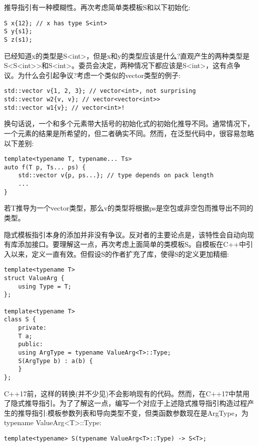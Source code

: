推导指引有一种模糊性。再次考虑简单类模板S和以下初始化:

\begin{lstlisting}[style=styleCXX]
S x{12}; // x has type S<int>
S y{s1};
S z(s1);
\end{lstlisting}

已经知道x的类型是S<int>，但是x和y的类型应该是什么?直观产生的两种类型是S<S<int>{}>和S<int>。委员会决定，两种情况下都应该是S<int>，这有点争议。为什么会引起争议?考虑一个类似的vector类型的例子:

\begin{lstlisting}[style=styleCXX]
std::vector v{1, 2, 3}; // vector<int>, not surprising
std::vector w2{v, v}; // vector<vector<int>>
std::vector w1{v}; // vector<int>!
\end{lstlisting}

换句话说，一个和多个元素带大括号的初始化式的初始化推导不同。通常情况下，一个元素的结果是所希望的，但二者确实不同。然而，在泛型代码中，很容易忽略以下差别:

\begin{lstlisting}[style=styleCXX]
template<typename T, typename... Ts>
auto f(T p, Ts... ps) {
	std::vector v{p, ps...}; // type depends on pack length
	...
}
\end{lstlisting}

若T推导为一个vector类型，那么v的类型将根据ps是空包或非空包而推导出不同的类型。

隐式模板指引本身的添加并非没有争议。反对者的主要论点是，该特性会自动向现有库添加接口。要理解这一点，再次考虑上面简单的类模板S。自模板在C++中引入以来，定义一直有效。但假设S的作者扩充了库，使得S的定义更加精细:

\begin{lstlisting}[style=styleCXX]
template<typename T>
struct ValueArg {
	using Type = T;
};

template<typename T>
class S {
	private:
	T a;
	public:
	using ArgType = typename ValueArg<T>::Type;
	S(ArgType b) : a(b) {
	}
};
\end{lstlisting}

C++17前，这样的转换(并不少见)不会影响现有的代码。然而，在C++17中禁用了隐式推导指引。为了了解这一点，编写一个对应于上述隐式推导指引构造过程产生的推导指引:模板参数列表和导向类型不变，但类函数参数现在是ArgType，为typename ValueArg<T>::Type:

\begin{lstlisting}[style=styleCXX]
template<typename> S(typename ValueArg<T>::Type) -> S<T>;
\end{lstlisting}

